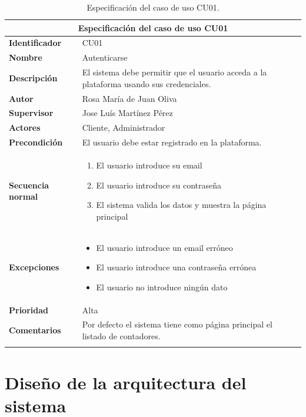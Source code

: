 \documentclass[pdftex,11pt,a4paper]{book}
\begin{document}
\begin{center}
\begin{longtable}{|m{}|m{11cm}|}
\hline
\multicolumn{2}{|c|}{\textbf{Especificación del caso de uso CU01}}\\
\hline 
\endhead

\textbf{Identificador} & CU01  
\\ \hline
\textbf{Nombre} & Autenticarse  
\\ \hline
\textbf{Descripción} & El sistema debe permitir que el usuario acceda a la plataforma usando sus credenciales.  
\\ \hline
\textbf{Autor} & Rosa María de Juan Oliva 
\\ \hline
\textbf{Supervisor} & Jose Luís Martínez Pérez  
\\ \hline
\textbf{Actores} & Cliente, Administrador 
\\ \hline
\textbf{Precondición} & El usuario debe estar registrado en la plataforma. 
\\ \hline
\textbf{Secuencia normal} & 
\begin{enumerate}
\addtolength{\itemsep}{-3mm}
\item El usuario introduce su email
\item El usuario introduce su contraseña
\item El sistema valida los datos y muestra la página principal
\end{enumerate}
\\ \hline
\textbf{Excepciones} &
\begin{itemize}
\addtolength{\itemsep}{-3mm}
\item El usuario introduce un email erróneo
\item El usuario introduce una contraseña errónea
\item El usuario no introduce ningún dato
\end{itemize}
\\ \hline
\textbf{Prioridad} & Alta  
\\ \hline
\textbf{Comentarios} & Por defecto el sistema tiene como página principal el listado de contadores.  
\\ \hline

\caption{Especificación del caso de uso CU01.} \label{tablalarga:tablaCU01}
\end{longtable}
\end{center}




\section{Diseño de la arquitectura del sistema}
\end{document}
